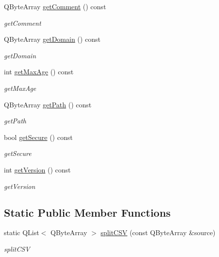 \begin{DoxyCompactItemize}
Q\+Byte\+Array \mbox{\hyperlink{class_http_cookie_ad48e447c1d4dfbed9e81713016ca0531}{get\+Comment}} () const
\begin{DoxyCompactList}\small\item\em get\+Comment \end{DoxyCompactList}\item 
Q\+Byte\+Array \mbox{\hyperlink{class_http_cookie_aeaafc0d8651b07c94d1ed247a4e23dff}{get\+Domain}} () const
\begin{DoxyCompactList}\small\item\em get\+Domain \end{DoxyCompactList}\item 
int \mbox{\hyperlink{class_http_cookie_a3a55c75cb4220b303cbed4713f538995}{get\+Max\+Age}} () const
\begin{DoxyCompactList}\small\item\em get\+Max\+Age \end{DoxyCompactList}\item 
Q\+Byte\+Array \mbox{\hyperlink{class_http_cookie_a3796862a6c50124eb5c987dd617a097c}{get\+Path}} () const
\begin{DoxyCompactList}\small\item\em get\+Path \end{DoxyCompactList}\item 
bool \mbox{\hyperlink{class_http_cookie_a270cd78805263b5ed80f4e3354caf4e4}{get\+Secure}} () const
\begin{DoxyCompactList}\small\item\em get\+Secure \end{DoxyCompactList}\item 
int \mbox{\hyperlink{class_http_cookie_ac390582430915aa5570c6a397f20210d}{get\+Version}} () const
\begin{DoxyCompactList}\small\item\em get\+Version \end{DoxyCompactList}\end{DoxyCompactItemize}
\subsection*{Static Public Member Functions}
\begin{DoxyCompactItemize}
\item 
static Q\+List$<$ Q\+Byte\+Array $>$ \mbox{\hyperlink{class_http_cookie_a3f086e32413e23fdab53ffefa70b8b0e}{split\+C\+SV}} (const Q\+Byte\+Array \&source)
\begin{DoxyCompactList}\small\item\em split\+C\+SV \end{DoxyCompactList}\end{DoxyCompactItemize}


